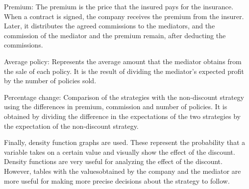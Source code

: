 \documentclass[review]{elsarticle}
\begin{document}
Premium: The premium is the price that the insured pays for the insurance. When a contract is signed, the company receives the premium from the insurer. Later, it distributes the agreed commissions to the mediators, and the commission of the mediator and the premium remain, after deducting the commissions.

Average policy: Represents the average amount that the mediator obtains from the sale of each policy. It is the result of dividing the mediator's expected profit by the number of policies sold.

Percentage change: Comparison of the strategies with the non-discount strategy using the differences in premium, commission and number of policies. It is obtained by dividing the difference in the expectations of the two strategies by the expectation of the non-discount strategy.

Finally, density function graphs are used. These represent the probability that a variable takes on a certain value and visually show the effect of the discount.
Density functions are very useful for analyzing the effect of the discount. However, tables with the values ​​obtained by the company and the mediator are more useful for making more precise decisions about the strategy to follow.
\end{document}
